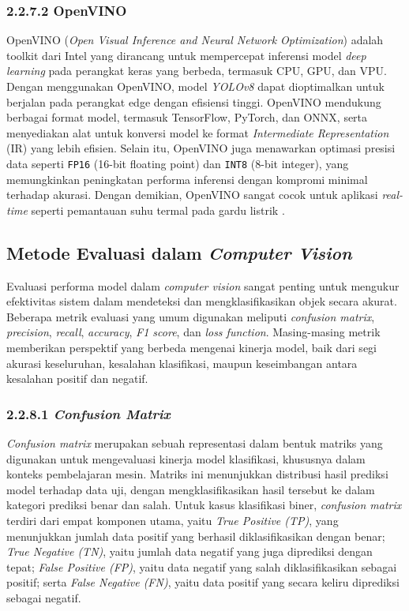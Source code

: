 \subsubsection{2.2.7.2 OpenVINO}
OpenVINO (\emph{Open Visual Inference and Neural Network Optimization}) adalah toolkit dari Intel yang dirancang untuk mempercepat inferensi model \emph{deep learning} pada perangkat keras yang berbeda, termasuk CPU, GPU, dan VPU. Dengan menggunakan OpenVINO, model \emph{YOLOv8} dapat dioptimalkan untuk berjalan pada perangkat edge dengan efisiensi tinggi. OpenVINO mendukung berbagai format model, termasuk TensorFlow, PyTorch, dan ONNX, serta menyediakan alat untuk konversi model ke format \emph{Intermediate Representation} (IR) yang lebih efisien. Selain itu, OpenVINO juga menawarkan optimasi presisi data seperti \texttt{FP16} (16-bit floating point) dan \texttt{INT8} (8-bit integer), yang memungkinkan peningkatan performa inferensi dengan kompromi minimal terhadap akurasi. Dengan demikian, OpenVINO sangat cocok untuk aplikasi \emph{real-time} seperti pemantauan suhu termal pada gardu listrik \cite{openvino2021toolkit}.

\subsection{Metode Evaluasi dalam \emph{Computer Vision}}

Evaluasi performa model dalam \emph{computer vision} sangat penting untuk mengukur efektivitas sistem dalam mendeteksi dan mengklasifikasikan objek secara akurat. Beberapa metrik evaluasi yang umum digunakan meliputi \emph{confusion matrix}, \emph{precision}, \emph{recall}, \emph{accuracy}, \emph{F1 score}, dan \emph{loss function}. Masing-masing metrik memberikan perspektif yang berbeda mengenai kinerja model, baik dari segi akurasi keseluruhan, kesalahan klasifikasi, maupun keseimbangan antara kesalahan positif dan negatif.

\subsubsection{2.2.8.1 \emph{Confusion Matrix}}
\emph{Confusion matrix} merupakan sebuah representasi dalam bentuk matriks yang digunakan untuk mengevaluasi kinerja model klasifikasi, khususnya dalam konteks pembelajaran mesin. Matriks ini menunjukkan distribusi hasil prediksi model terhadap data uji, dengan mengklasifikasikan hasil tersebut ke dalam kategori prediksi benar dan salah. Untuk kasus klasifikasi biner, \emph{confusion matrix} terdiri dari empat komponen utama, yaitu \emph{True Positive (TP)}, yang menunjukkan jumlah data positif yang berhasil diklasifikasikan dengan benar; \emph{True Negative (TN)}, yaitu jumlah data negatif yang juga diprediksi dengan tepat; \emph{False Positive (FP)}, yaitu data negatif yang salah diklasifikasikan sebagai positif; serta \emph{False Negative (FN)}, yaitu data positif yang secara keliru diprediksi sebagai negatif.





